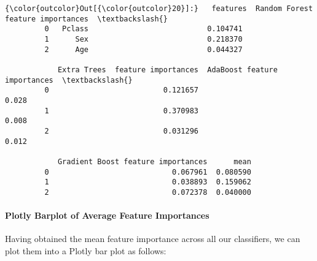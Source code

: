 \documentclass[11pt]{article}
\begin{document}
\begin{Verbatim}[commandchars=\\\{\}]
{\color{outcolor}Out[{\color{outcolor}20}]:}   features  Random Forest feature importances  \textbackslash{}
         0   Pclass                           0.104741   
         1      Sex                           0.218370   
         2      Age                           0.044327   
         
            Extra Trees  feature importances  AdaBoost feature importances  \textbackslash{}
         0                          0.121657                         0.028   
         1                          0.370983                         0.008   
         2                          0.031296                         0.012   
         
            Gradient Boost feature importances      mean  
         0                            0.067961  0.080590  
         1                            0.038893  0.159062  
         2                            0.072378  0.040000  
\end{Verbatim}
            
    \paragraph{Plotly Barplot of Average Feature
Importances}\label{plotly-barplot-of-average-feature-importances}

Having obtained the mean feature importance across all our classifiers,
we can plot them into a Plotly bar plot as follows:
\end{document}
